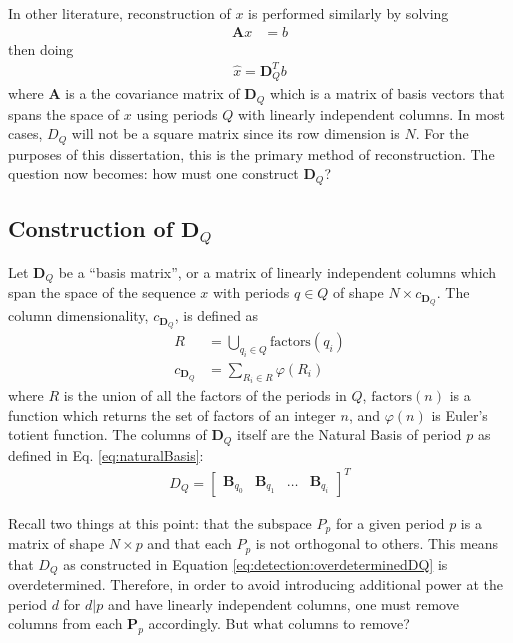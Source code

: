 In other literature, reconstruction of $x$ is performed similarly by solving
\begin{align} \label{eq:detection:convex}
    \bm{A}x &= b
\end{align}
then doing
\begin{align}
    \hat{x} = \bm{D}_{Q}^{T} b
\end{align}
where $\bm{A}$ is a the covariance matrix of $\bm{D}_Q$ which is a matrix of basis vectors that spans the space of $x$ using periods $Q$ with linearly independent columns. In most cases, $D_Q$ will not be a square matrix since its row dimension is $N$. For the purposes of this dissertation, this is the primary method of reconstruction. The question now becomes: how must one construct $\bm{D}_Q$?

    \subsection{Construction of $\bm{D}_Q$}\label{section:detection:D_Q}
    Let $\bm{D}_Q$ be a ``basis matrix'', or a matrix of linearly independent columns which span the space of the sequence $x$ with periods $q \in Q$ of shape $N \times c_{\bm{D}_Q}$. The column dimensionality, $c_{\bm{D}_Q}$, is defined as
    \begin{align}
        R &= \bigcup_{q_i \in Q} \text{factors}(q_i) \label{eq:A:R} \\
        c_{\bm{D}_Q} &= \sum_{R_i \in R} \varphi(R_i) \label{eq:A:c_A}
    \end{align}
    where $R$ is the union of all the factors of the periods in $Q$, $\text{factors}(n)$ is a function which returns the set of factors of an integer $n$, and $\varphi(n)$ is Euler's totient function. The columns of $\bm{D}_Q$ itself are the Natural Basis of period $p$ as defined in Eq. \ref{eq:naturalBasis}:
    \begin{align}\label{eq:detection:overdeterminedDQ}
        D_Q = \begin{bmatrix}
            \bm{B}_{q_{0}} & \bm{B}_{q_{1}} & \hdots & \bm{B}_{q_{i}}
        \end{bmatrix}^{T}
    \end{align}

    Recall two things at this point: that the subspace $P_p$ for a given period $p$ is a matrix of shape $N \times p$ and that each $P_p$ is not orthogonal to others. This means that $D_Q$ as constructed in Equation \eqref{eq:detection:overdeterminedDQ} is overdetermined. Therefore, in order to avoid introducing additional power at the period $d$ for $d|p$ and have linearly independent columns, one must remove columns from each $\bm{P}_p$ accordingly. But what columns to remove?

